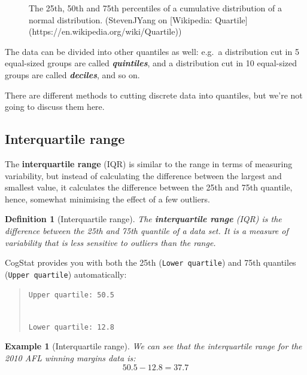 \documentclass[
  11pt,
]{book}
\theoremstyle{indenteddefinition}
\newtheorem{definition}{Definition}[chapter]
\theoremstyle{indenteddefinition}
\newtheorem{example}{Example}[chapter]
\theoremstyle{definition}
\theoremstyle{definition}
\theoremstyle{remark}
\begin{document}
\begin{callout}[Quantiles]
\begin{figure}
{}

\caption{The 25th, 50th and 75th percentiles of a cumulative distribution of a normal distribution. (StevenJYang on [Wikipedia: Quartile](https://en.wikipedia.org/wiki/Quartile))}\label{fig:unnamed-chunk-17}
\end{figure}

The data can be divided into other quantiles as well: e.g.~a distribution cut in 5 equal-sized groups are called \textbf{\emph{quintiles}}, and a distribution cut in 10 equal-sized groups are called \textbf{\emph{deciles}}, and so on.

There are different methods to cutting discrete data into quantiles, but we're not going to discuss them here.

\end{callout}

\hypertarget{IQR}{%
\subsection{Interquartile range}\label{IQR}}

The \textbf{interquartile range} (IQR) is similar to the range in terms of measuring variability, but instead of calculating the difference between the largest and smallest value, it calculates the difference between the 25th and 75th quantile, hence, somewhat minimising the effect of a few outliers.

\begin{definition}[Interquartile range]
\protect\hypertarget{def:defIQR}{}\label{def:defIQR}The \textbf{interquartile range} (IQR) is the difference between the 25th and 75th quantile of a data set. It is a measure of variability that is less sensitive to outliers than the range.
\end{definition}

CogStat provides you with both the 25th (\texttt{Lower\ quartile}) and 75th quantiles (\texttt{Upper\ quartile}) automatically:

\begin{quote}
\texttt{Upper\ quartile:\ 50.5}\strut \\
\texttt{Lower\ quartile:\ 12.8}
\end{quote}

\begin{example}[Interquartile range]
\protect\hypertarget{exm:exIQR}{}\label{exm:exIQR}We can see that the interquartile range for the 2010 AFL winning margins data is:
\[
50.5 - 12.8 = \mathbf{37.7}
\]
\end{example}
\end{document}
